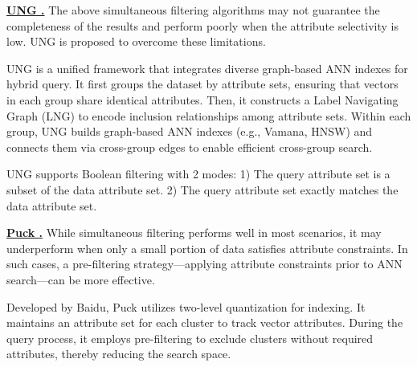\documentclass[sigconf, nonacm]{acmart}
\begin{document}
	
	\noindent\textbf{\underline{UNG \cite{UNG}.}} The above simultaneous filtering algorithms may not guarantee the completeness of the results and perform poorly when the attribute selectivity is low. UNG is proposed to overcome these limitations.
	
	UNG is a unified framework that integrates diverse graph-based ANN indexes for hybrid query. It first groups the dataset by attribute sets, ensuring that vectors in each group share identical attributes. Then, it constructs a Label Navigating Graph (LNG) to encode inclusion relationships among attribute sets. Within each group, UNG builds graph-based ANN indexes (e.g., Vamana, HNSW) and connects them via cross-group edges to enable efficient cross-group search.
	
	UNG supports Boolean filtering with 2 modes:  
	1) The query attribute set is a subset of the data attribute set.  
	2) The query attribute set exactly matches the data attribute set.
	
	
	
	
	\noindent\textbf{\underline{Puck \cite{puck}.}}  
	While simultaneous filtering performs well in most scenarios, it may underperform when only a small portion of data satisfies attribute constraints. In such cases, a pre-filtering strategy—applying attribute constraints prior to ANN search—can be more effective.
	
	Developed by Baidu, Puck utilizes two-level quantization for indexing. It maintains an attribute set for each cluster to track vector attributes. During the query process, it employs pre-filtering to exclude clusters without required attributes, thereby reducing the search space.
	
\end{document}
